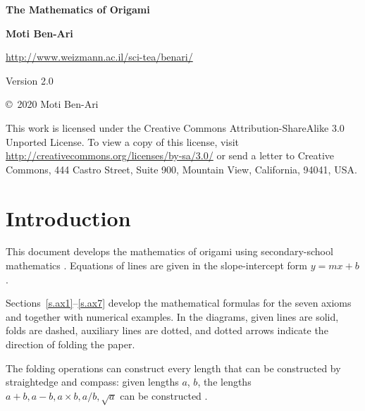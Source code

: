 
\thispagestyle{empty}

\begin{center}
\textbf{\LARGE The Mathematics of Origami}

\bigskip
\bigskip

\textbf{\Large Moti Ben-Ari}

\bigskip
\bigskip

\url{http://www.weizmann.ac.il/sci-tea/benari/}

\bigskip
\bigskip

Version 2.0
\end{center}

\bigskip

\begin{small}
\begin{center}
\copyright{}\ 2020 Moti Ben-Ari
\end{center}

This work is licensed under the Creative Commons Attribution-ShareAlike 3.0 Unported License. To view a copy of this license, visit \url{http://creativecommons.org/licenses/by-sa/3.0/} or send a letter to Creative Commons, 444 Castro Street, Suite 900, Mountain View, California, 94041, USA.
\end{small}

\newpage

\tableofcontents



\newpage

\section{Introduction}

This document develops the mathematics of origami using secondary-school mathematics \cite{geometry}. Equations of lines are given in the slope-intercept form $y=mx+b$.

Sections~\ref{s.ax1}--\ref{s.ax7} develop the mathematical formulas for the seven axioms and together with numerical examples. In the diagrams, given lines are solid, folds are dashed, auxiliary lines are dotted, and dotted arrows indicate the direction of folding the paper.

The folding operations can construct every length that can be constructed by straightedge and compass: given lengths $a$, $b$, the lengths $a+b, a-b, a\times b, a/b, \sqrt{a}$ can be constructed \cite[Chapter~4]{hwa}.

